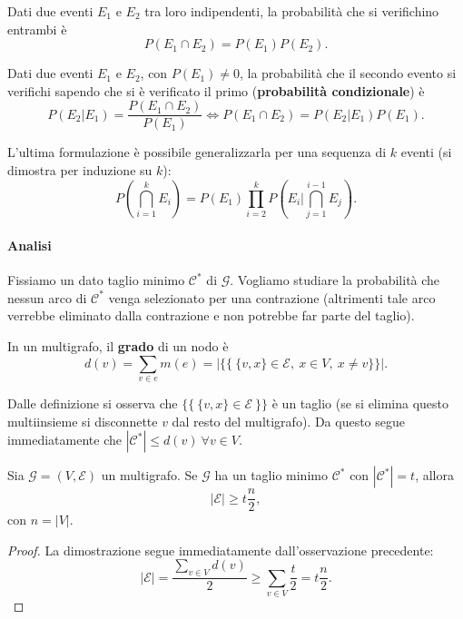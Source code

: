 Dati due eventi $E_1$ e $E_2$ tra loro indipendenti, la probabilità che si verifichino entrambi è
\[
P(E_1\cap E_2)=P(E_1)P(E_2).
\]

Dati due eventi $E_1$ e $E_2$, con $P(E_1)\neq0$, la probabilità che il secondo evento si verifichi sapendo che si è verificato il primo (\textbf{probabilità condizionale}) è
\[
P(E_2|E_1)=\frac{P(E_1\cap E_2)}{P(E_1)} \Leftrightarrow P(E_1\cap E_2)=P(E_2|E_1)P(E_1).
\]

L'ultima formulazione è possibile generalizzarla per una sequenza di $k$ eventi (si dimostra per induzione su $k$):
\[
P\left(\bigcap_{i=1}^{k}E_i\right)=P(E_1)\prod_{i=2}^kP\left(E_i|\bigcap_{j=1}^{i-1}E_j\right).
\]

\paragraph{Analisi}
Fissiamo un dato taglio minimo $\mathcal{C^*}$ di $\mathcal{G}$. Vogliamo studiare la probabilità che nessun arco di $\mathcal{C^*}$ venga selezionato per una contrazione (altrimenti tale arco verrebbe eliminato dalla contrazione e non potrebbe far parte del taglio).

\begin{definizione}
In un multigrafo, il \textbf{grado} di un nodo è
\[
d(v)=\sum_{v\in e}m(e)=|\{\{\ \{v,x\}\in\mathcal{E},\ x\in V,\ x\neq v\}\}|.
\]
\end{definizione}

Dalle definizione si osserva che $\{\{\ \{v,x\}\in\mathcal{E}\ \}\}$ è un taglio (se si elimina questo multiinsieme si disconnette $v$ dal resto del multigrafo). Da questo segue immediatamente che $|\mathcal{C^*}|\leq d(v)\ \forall v\in V$.

\begin{proposizione}
Sia $\mathcal{G}=(V,\mathcal{E})$ un multigrafo. Se $\mathcal{G}$ ha un taglio minimo $\mathcal{C^*}$ con $|\mathcal{C^*}|=t$, allora
\[
|\mathcal{E}|\geq t\frac{n}{2},
\]
con $n=|V|$.
\end{proposizione}
\begin{proof}
La dimostrazione segue immediatamente dall'osservazione precedente:
\[
|\mathcal{E}|=\frac{\sum_{v\in V}d(v)}{2}\geq \sum_{v\in V}\frac{t}{2}=t\frac{n}{2}.
\]
\end{proof}

